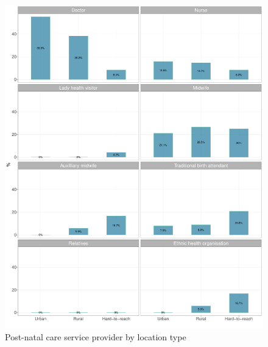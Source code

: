 \documentclass[12pt,a4paper]{article}
\begin{document}
\begin{figure}[H]

{\centering \includegraphics{kayinReport_files/figure-latex/pnc3Plot-1} 

}

\caption{Post-natal care service provider by location type}\label{fig:pnc3Plot}
\end{figure}
\end{document}
